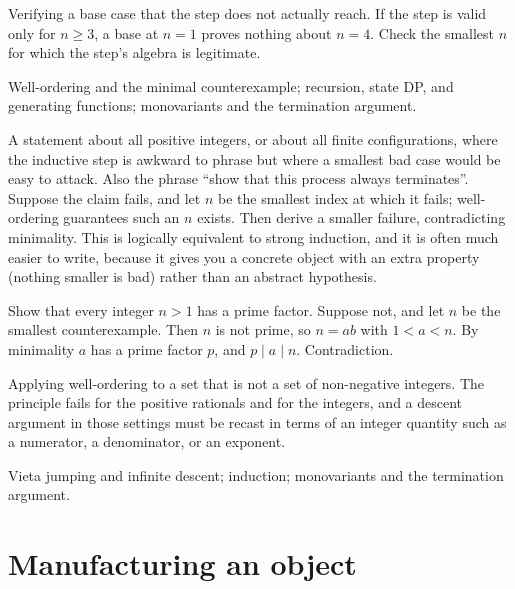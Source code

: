 \begin{trap}
Verifying a base case that the step does not actually reach. If the step is valid only for $n\geq3$, a base at $n=1$ proves nothing about $n=4$. Check the smallest $n$ for which the step's algebra is legitimate.
\end{trap}

\begin{seealsob}Well-ordering and the minimal counterexample; recursion, state DP, and generating functions; monovariants and the termination argument.\end{seealsob}

\cue A statement about all positive integers, or about all finite configurations, where the inductive step is awkward to phrase but where a smallest bad case would be easy to attack. Also the phrase ``show that this process always terminates''.
\method Suppose the claim fails, and let $n$ be the smallest index at which it fails; well-ordering guarantees such an $n$ exists. Then derive a smaller failure, contradicting minimality. This is logically equivalent to strong induction, and it is often much easier to write, because it gives you a concrete object with an extra property (nothing smaller is bad) rather than an abstract hypothesis.

\begin{worked}
Show that every integer $n>1$ has a prime factor. Suppose not, and let $n$ be the smallest counterexample. Then $n$ is not prime, so $n=ab$ with $1<a<n$. By minimality $a$ has a prime factor $p$, and $p\mid a\mid n$. Contradiction.
\end{worked}

\begin{trap}
Applying well-ordering to a set that is not a set of non-negative integers. The principle fails for the positive rationals and for the integers, and a descent argument in those settings must be recast in terms of an integer quantity such as a numerator, a denominator, or an exponent.
\end{trap}

\begin{seealsob}Vieta jumping and infinite descent; induction; monovariants and the termination argument.\end{seealsob}

\section{Manufacturing an object}

